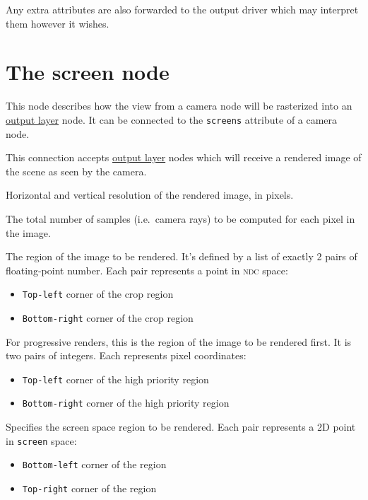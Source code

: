 \documentclass[oneside,ebook]{memoir}
\newcommand*{\acronym}[1]{\textsc{\lowercase{#1}}}
\newcommand{\paramlistitemTN}[2]{\item[#2\textcolor{lightgray}{\dotfill}#1]}
\begin{document}
Any extra attributes are also forwarded to the output driver which may interpret them however it wishes.

\section{The screen node}
\label{section:screennode}
This node describes how the view from a camera node will be rasterized into an \hyperref[section:outputlayernode]{output layer} node.
It can be connected to the \lstinline|screens| attribute of a camera node.
\begin{paramlist}
\paramlistitemTN{<connection>}{outputlayers}
This connection accepts \hyperref[section:outputlayernode]{output layer} nodes which will receive a rendered image of the scene as seen by the camera.
\paramlistitemTN{integer\lbrack{}2\rbrack{}}{resolution}
Horizontal and vertical resolution of the rendered image, in pixels.
\paramlistitemTN{integer}{oversampling}
The total number of samples (i.e.\ camera rays) to be computed for each pixel in the image.
\paramlistitemTN{2 $\times$ float\lbrack{}2\rbrack{}}{crop}
The region of the image to be rendered. It's defined by a list of exactly 2 pairs of floating-point number. Each pair represents a point in \acronym{NDC} space:
\begin{itemize}
\item \lstinline|Top-left| corner of the crop region
\item \lstinline|Bottom-right| corner of the crop region
\end{itemize}
\paramlistitemTN{2 $\times$ int\lbrack{}2\rbrack{}}{prioritywindow}
For progressive renders, this is the region of the image to be rendered first. It is two pairs of integers. Each represents pixel coordinates:
\begin{itemize}
\item \lstinline|Top-left| corner of the high priority region
\item \lstinline|Bottom-right| corner of the high priority region
\end{itemize}
\paramlistitemTN{2 $\times$ double\lbrack{}2\rbrack{}}{screenwindow}
Specifies the screen space region to be rendered. Each pair represents a 2D point in \lstinline|screen| space:
\begin{itemize}
\item \lstinline|Bottom-left| corner of the region
\item \lstinline|Top-right| corner of the region
\end{itemize}

\end{paramlist}
\end{document}
